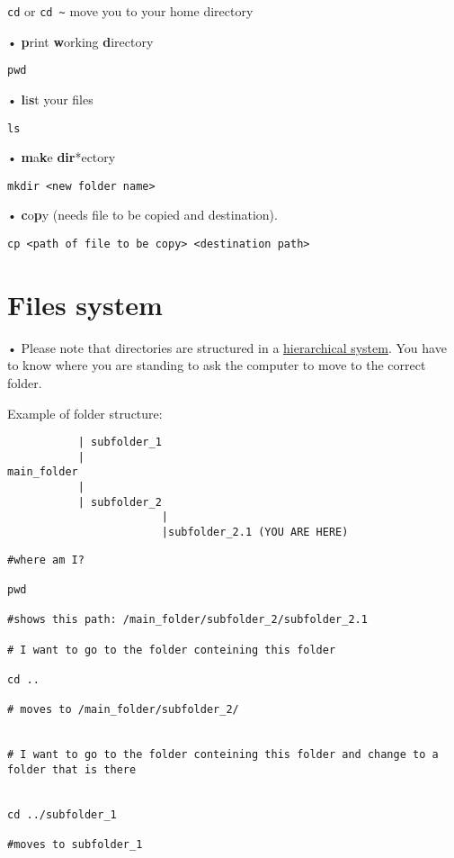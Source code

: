 \documentclass[
]{book}
\begin{document}
\texttt{cd} or \texttt{cd\ \textasciitilde{}} move you to your home directory

• \textbf{p}rint \textbf{w}orking \textbf{d}irectory

\begin{verbatim}
pwd
\end{verbatim}

• \textbf{l}i\textbf{s}t your files

\begin{verbatim}
ls
\end{verbatim}

• \textbf{m}a\textbf{k}e \textbf{dir}*ectory

\begin{verbatim}
mkdir <new folder name>
\end{verbatim}

• \textbf{c}o\textbf{p}y (needs file to be copied and destination).

\begin{verbatim}
cp <path of file to be copy> <destination path>
\end{verbatim}

\hypertarget{files-system}{%
\section{Files system}\label{files-system}}

• Please note that directories are structured in a \href{https://www.geeksforgeeks.org/structures-of-directory-in-operating-system/}{hierarchical system}. You have to know where you are standing to ask the computer to move to the correct folder.

Example of folder structure:

\begin{verbatim}
           | subfolder_1 
           | 
main_folder
           |
           | subfolder_2
                        |
                        |subfolder_2.1 (YOU ARE HERE)
\end{verbatim}

\begin{verbatim}
#where am I?

pwd

#shows this path: /main_folder/subfolder_2/subfolder_2.1

# I want to go to the folder conteining this folder

cd ..

# moves to /main_folder/subfolder_2/


# I want to go to the folder conteining this folder and change to a folder that is there


cd ../subfolder_1

#moves to subfolder_1
\end{verbatim}
\end{document}
